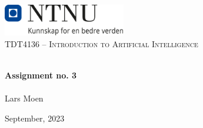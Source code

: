 \begin{titlepage}
\vbox{ }
\vbox{ }
\begin{center}
\includegraphics[width=0.40\textwidth]{Images/NTNU_logo.png}\\[1cm]
\textsc{\Large TDT4136 – Introduction to Artificial Intelligence}\\[0.5cm]
\vbox{ }

\HRule \\[0.4cm]
{ \huge \bfseries Assignment no. 3}\\[0.4cm]
\HRule \\[1.5cm]

\large
Lars Moen
\vfill

{\large September, 2023}
\end{center}
\end{titlepage}